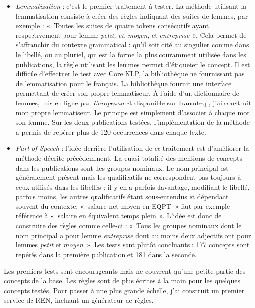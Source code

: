 \begin{itemize}
    \item \textit{Lemmatization} : c'est le premier traitement à tester. La méthode utilisant la lemmatisation consiste à créer des règles indiquant des suites de lemmes, par exemple : «~Toutes les suites de quatre tokens consécutifs ayant respectivement pour lemme \textit{petit}, \textit{et}, \textit{moyen}, et \textit{entreprise}~». Cela permet de s'affranchir du contexte grammatical : qu'il soit cité au singulier comme dans le libellé, ou au pluriel, qui est la forme la plus couramment utilisée dans les publications, la règle utilisant les lemmes permet d'étiqueter le concept. Il est difficile d'effectuer le test avec Core NLP, la bibliothèque ne fournissant pas de lemmatisation pour le français. La bibliothèque fournit une interface permettant de créer son propre lemmatiseur. À l'aide d'un dictionnaire de lemmes, mis en ligne par \textit{Europeana} et disponible sur \href{http://www.iramuteq.org/}{Iramuteq} \cite{iramuteq}, j'ai construit mon propre lemmatiseur. Le principe est simplement d'associer à chaque mot son lemme. Sur les deux publications testées, l'implémentation de la méthode a permis de repérer plus de 120 occurrences dans chaque texte.
    \newline
    
    \item \textit{Part-of-Speech} : l'idée derrière l'utilisation de ce traitement est d'améliorer la méthode décrite précédemment. La quasi-totalité des mentions de concepts dans les publications sont des groupes nominaux. Le nom principal est généralement présent mais les qualificatifs ne correspondent pas toujours à ceux utilisés dans les libellés : il y en a parfois davantage, modifiant le libellé, parfois moins, les autres qualificatifs étant sous-entendus et dépendant souvent du contexte. «~salaire net moyen en EQPT~» fait par exemple référence à «~salaire en équivalent temps plein~». L'idée est donc de construire des règles comme celle-ci : «~Tous les groupes nominaux dont le nom principal a pour lemme \textit{entreprise} dont au moins deux adjectifs ont pour lemmes \textit{petit} et \textit{moyen}~». Les tests sont plutôt concluants : 177 concepts sont repérés dans la première publication et 181 dans la seconde.
    \newline
\end{itemize}

Les premiers tests sont encourageants mais ne couvrent qu'une petite partie des concepts de la base. Les règles sont de plus écrites à la main pour les quelques concepts testés. Pour passer à une plus grande échelle, j'ai construit un premier service de REN, incluant un générateur de règles.
\label{section 2.2.4}

